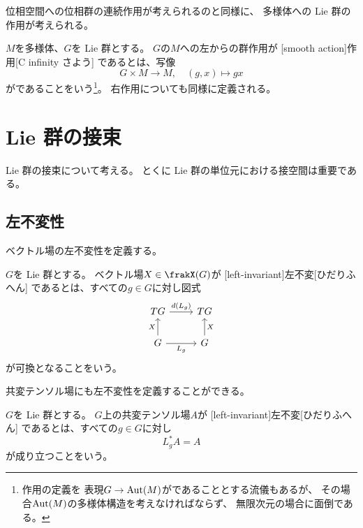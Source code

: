 \documentclass[report]{jlreq}
\begin{document}
位相空間への位相群の連続作用が考えられるのと同様に、
多様体への Lie 群の{\smooth}作用が考えられる。

\begin{definition}[{\smooth}作用]
    $M$を多様体、$G$を Lie 群とする。
    $G$の$M$への左からの群作用が
    [smooth action]{{\smooth}作用}[C infinity さよう]
    であるとは、写像
    \begin{equation}
        G \times M \to M,
        \quad
        (g, x) \mapsto gx
    \end{equation}
    が{\smooth}であることをいう\footnote{
        {\smooth}作用の定義を
        表現$G \to \operatorname{Aut}(M)$が{\smooth}であることとする流儀もあるが、
        その場合$\operatorname{Aut}(M)$の多様体構造を考えなければならず、
        無限次元の場合に面倒である。
    }。
    右作用についても同様に定義される。
\end{definition}


%
\section{Lie 群の接束}

Lie 群の接束について考える。
とくに Lie 群の単位元における接空間は重要である。

\subsection{左不変性}

ベクトル場の左不変性を定義する。

\begin{definition}[左不変ベクトル場]
    $G$を Lie 群とする。
    ベクトル場$X \in \frakX(G)$が
    [left-invariant]{左不変}[ひだりふへん]
    であるとは、すべての$g \in G$に対し図式
    \begin{equation}
        \begin{tikzcd}
            TG \ar{r}{d(L_g)} & TG \\
            G \ar{u}{X} \ar{r}[swap]{L_g} & G \ar{u}[swap]{X}
        \end{tikzcd}
    \end{equation}
    が可換となることをいう。
\end{definition}

共変テンソル場にも左不変性を定義することができる。

\begin{definition}[左不変共変テンソル場]
    $G$を Lie 群とする。
    $G$上の共変テンソル場$A$が
    [left-invariant]{左不変}[ひだりふへん]
    であるとは、すべての$g \in G$に対し
    \begin{equation}
        L_g^* A = A
    \end{equation}
    が成り立つことをいう。
\end{definition}
\end{document}
